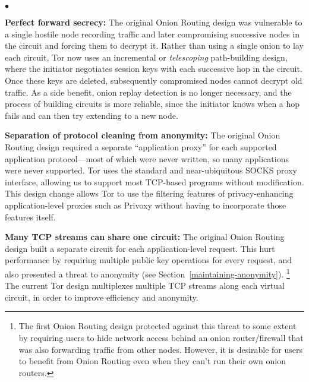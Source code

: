 \documentclass[times,10pt,twocolumn]{article}
\newenvironment{tightlist}{\begin{list}{$\bullet$}{
  \setlength{\itemsep}{0mm}
    \setlength{\parsep}{0mm}
    }}{\end{list}}
\begin{document}
\begin{tightlist}

\item \textbf{Perfect forward secrecy:} The original Onion Routing
design was vulnerable to a single hostile node recording traffic and later
compromising successive nodes in the circuit and forcing them to
decrypt it. 
Rather than using a single onion to lay each circuit,
Tor now uses an incremental or \emph{telescoping}
path-building design, where the initiator negotiates session keys with
each successive hop in the circuit.  Once these keys are deleted,
subsequently compromised nodes cannot decrypt old traffic.
As a side benefit, onion replay detection is no longer
necessary, and the process of building circuits is more reliable, since
the initiator knows when a hop fails and can then try extending to a new node.


\item \textbf{Separation of protocol cleaning from anonymity:}
The original Onion Routing design required a separate ``application
proxy'' for each
supported application protocol---most
of which were never written, so many applications were never supported.
Tor uses the standard and near-ubiquitous SOCKS
\cite{socks4,socks5} proxy interface, allowing us to support most TCP-based
programs without modification.  This design change allows Tor to
use the filtering features of privacy-enhancing
application-level proxies such as Privoxy \cite{privoxy} without having to
incorporate those features itself.

\item \textbf{Many TCP streams can share one circuit:} The original
Onion Routing design built a separate circuit for each application-level
request.
This hurt performance by requiring multiple public key operations for
every request, and also presented
a threat to anonymity (see Section~\ref{maintaining-anonymity}).
\footnote{The first Onion Routing design \cite{or-ih96} protected against
this threat to some
extent by requiring users to hide network access behind an onion
router/firewall that was also forwarding traffic from other nodes.
However, it is desirable for users to
benefit from Onion Routing even when they can't run their own 
onion routers.
%
}
The current Tor design multiplexes multiple TCP streams along each virtual
circuit, in order to improve efficiency and anonymity.


\end{tightlist}
\end{document}
